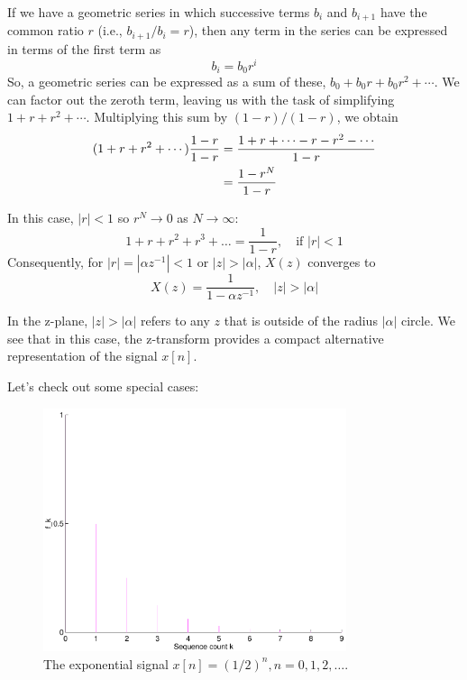 If we have a geometric series in which successive terms $b_i$ and
$b_{i+1}$ have the common ratio $r$ (i.e., $b_{i+1}/b_i = r$), then
any term in the series can be expressed in terms of the first term as
\begin{equation*}
b_i = b_0 r^i
\end{equation*}
So, a geometric series can be expressed as a sum of these, $b_0 + b_0r
+ b_0r^2 + \cdots$. We can factor out the zeroth term, leaving us with
the task of simplifying $1 + r + r^2 + \cdots$. Multiplying this sum
by $(1-r)/(1-r)$, we obtain
\begin{align}
(1 + r + r^2 + \cdots)\frac{1-r}{1-r}
  & = \frac{1 + r + \cdots - r - r^2 - \cdots}{1-r} \notag\\
  & = \frac{1-r^N}{1-r}
\end{align}

In this case, $|r|<1$ so $r^N \rightarrow 0$ as $N \rightarrow \infty$:
\begin{equation}
1+r+r^2+r^3+\ldots = \frac{1}{1-r}, \quad\text{if } |r|<1
\end{equation}
Consequently, for $|r|=|\alpha z^{-1}|<1$ or $|z|>|\alpha|$,
$X(z)$ converges to
\begin{equation}
X(z)=\frac{1}{1-\alpha z^{-1}}, \quad |z|>|\alpha|
\label{eq:zt-expoF}
\end{equation}

In the z-plane, $|z|>|\alpha|$ refers to any $z$ that is outside of
the radius $|\alpha|$ circle. We see that in this case, the
z-transform provides a compact alternative representation of the
signal $x[n]$.

Let's check out some special cases:

\begin{figure}
\centerline{\includegraphics[width=3.5in]{ch-conv/zt_expo_rf}}
\caption{The exponential signal $x[n]=(1/2)^n, n=0,1,2,\ldots$.
\label{fig:zt-expo-r0.5f}}
\end{figure}

